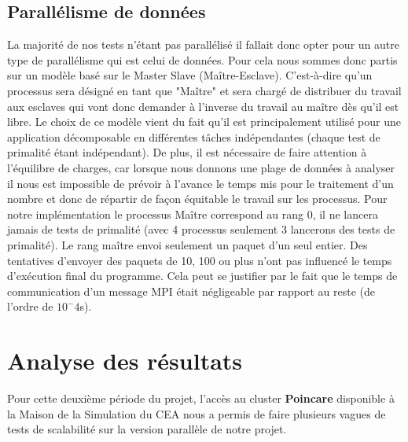 		\subsection{Parallélisme de données}
		La majorité de nos tests n'étant pas parallélisé il fallait donc opter pour un autre type de parallélisme qui est celui de données. Pour cela nous sommes donc partis sur un modèle basé sur le Master Slave (Maître-Esclave). C'est-à-dire qu'un processus sera désigné en tant que "Maître" et sera chargé de distribuer du travail aux esclaves qui vont donc demander à l'inverse du travail au maître dès qu'il est libre.  Le choix de ce modèle vient du fait qu'il est principalement utilisé pour une application décomposable en différentes tâches indépendantes (chaque test de primalité étant indépendant). De plus, il est nécessaire de faire attention à l'équilibre de charges, car lorsque nous donnons une plage de données à analyser il nous est impossible de prévoir à l'avance le temps mis pour le traitement d'un nombre et donc de répartir de façon équitable le travail sur les processus. 
Pour notre implémentation le processus Maître correspond au rang 0, il ne lancera jamais de tests de primalité (avec 4 processus seulement 3 lancerons des tests de primalité). Le rang maître envoi seulement un paquet d'un seul entier. Des tentatives d'envoyer des paquets de 10, 100 ou plus n'ont pas influencé le temps d'exécution final du programme. Cela peut se justifier par le fait que le temps de communication d'un message MPI était négligeable par rapport au reste (de l'ordre de $10^-4$s).

	\section{Analyse des résultats}
	Pour cette deuxième période du projet, l'accès au cluster \textbf{Poincare}\cite{poincare} disponible à la Maison de la Simulation du CEA nous a permis de faire plusieurs vagues de tests de scalabilité sur la version parallèle de notre projet.
	

